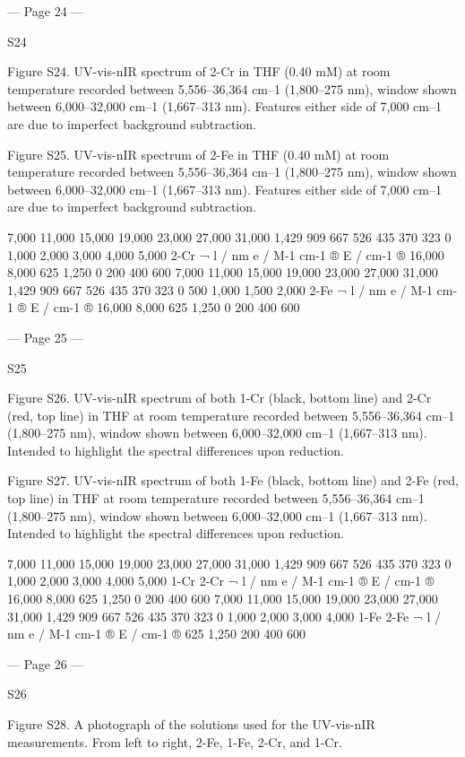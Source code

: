 --- Page 24 ---
 
 
S24 
 
 
 
Figure S24. UV-vis-nIR spectrum of 2-Cr in THF (0.40 mM) at room temperature recorded between 5,556–36,364 cm–1 
(1,800–275 nm), window shown between 6,000–32,000 cm–1 (1,667–313 nm). Features either side of 7,000 cm–1 are due to 
imperfect background subtraction. 
 
 
Figure S25. UV-vis-nIR spectrum of 2-Fe in THF (0.40 mM) at room temperature recorded between 5,556–36,364 cm–1 
(1,800–275 nm), window shown between 6,000–32,000 cm–1 (1,667–313 nm). Features either side of 7,000 cm–1 are due to 
imperfect background subtraction. 
 
7,000
11,000
15,000
19,000
23,000
27,000
31,000
1,429
909
667
526
435
370
323
0
1,000
2,000
3,000
4,000
5,000
2-Cr
¬ l / nm
e / M-1 cm-1 ®
E / cm-1 ®
16,000
8,000
625
1,250
0
200
400
600
7,000
11,000
15,000
19,000
23,000
27,000
31,000
1,429
909
667
526
435
370
323
0
500
1,000
1,500
2,000
2-Fe
¬ l / nm
e / M-1 cm-1 ®
E / cm-1 ®
16,000
8,000
625
1,250
0
200
400
600


--- Page 25 ---
 
 
S25 
 
 
 
Figure S26. UV-vis-nIR spectrum of both 1-Cr (black, bottom line) and 2-Cr (red, top line) in THF at room temperature 
recorded between 5,556–36,364 cm–1 (1,800–275 nm), window shown between 6,000–32,000 cm–1 (1,667–313 nm). Intended 
to highlight the spectral differences upon reduction. 
 
 
Figure S27. UV-vis-nIR spectrum of both 1-Fe (black, bottom line) and 2-Fe (red, top line) in THF at room temperature 
recorded between 5,556–36,364 cm–1 (1,800–275 nm), window shown between 6,000–32,000 cm–1 (1,667–313 nm). Intended 
to highlight the spectral differences upon reduction. 
 
7,000
11,000
15,000
19,000
23,000
27,000
31,000
1,429
909
667
526
435
370
323
0
1,000
2,000
3,000
4,000
5,000
1-Cr
2-Cr
¬ l / nm
e / M-1 cm-1 ®
E / cm-1 ®
16,000
8,000
625
1,250
0
200
400
600
7,000
11,000
15,000
19,000
23,000
27,000
31,000
1,429
909
667
526
435
370
323
0
1,000
2,000
3,000
4,000
1-Fe
2-Fe
¬ l / nm
e / M-1 cm-1 ®
E / cm-1 ®
625
1,250
200
400
600


--- Page 26 ---
 
 
S26 
 
 
 
Figure S28. A photograph of the solutions used for the UV-vis-nIR measurements. From left to right, 2-Fe, 1-Fe, 2-Cr, and 
1-Cr. 
 
